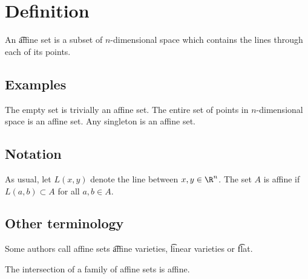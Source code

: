 
\section*{Definition}

An \t{affine set} is a subset of $n$-dimensional space which contains the lines through each of its points.

\subsection*{Examples}

The empty set is trivially an affine set.
The entire set of points in $n$-dimensional space is an affine set.
Any singleton is an affine set.

\subsection*{Notation}

As usual, let $L(x, y)$ denote the line between $x, y \in \R ^n$.
The set $A$ is affine if $L(a, b) \subset A$ for all $a, b \in A$.

\subsection*{Other terminology}

Some authors call affine sets \t{affine varieties}, \t{linear varieties} or \t{flat}.

\begin{proposition}
The intersection of a family of affine sets is affine.
\end{proposition}

\blankpage